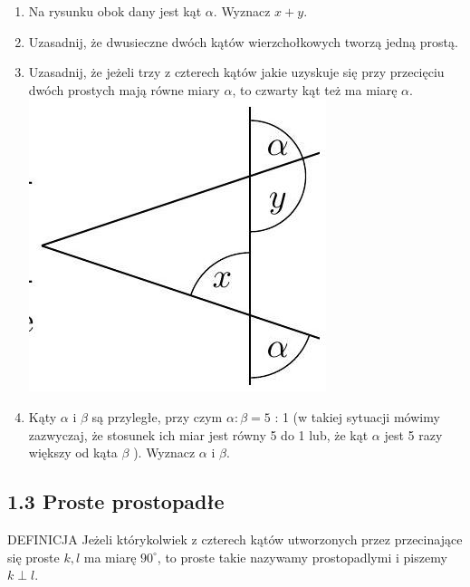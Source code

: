 \documentclass[10pt]{article}
\begin{document}
\begin{enumerate}
  \item Na rysunku obok dany jest kąt \(\alpha\). Wyznacz \(x+y\).
  \item Uzasadnij, że dwusieczne dwóch kątów wierzchołkowych tworzą jedną prostą.
  \item Uzasadnij, że jeżeli trzy z czterech kątów jakie uzyskuje się przy przecięciu dwóch prostych mają równe miary \(\alpha\), to czwarty kąt też ma miarę \(\alpha\).\\
\includegraphics[max width=\textwidth, center]{2024_11_21_71f62bd117d375398909g-009(1)}
  \item Kąty \(\alpha\) i \(\beta\) są przyległe, przy czym \(\alpha: \beta=5\) : 1 (w takiej sytuacji mówimy zazwyczaj, że stosunek ich miar jest równy 5 do 1 lub, że kąt \(\alpha\) jest 5 razy większy od kąta \(\beta\) ). Wyznacz \(\alpha\) i \(\beta\).
\end{enumerate}

\subsection*{1.3 Proste prostopadłe}
DEFINICJA Jeżeli którykolwiek z czterech kątów utworzonych przez przecinające się proste \(k, l\) ma miarę \(90^{\circ}\), to proste takie nazywamy prostopadlymi i piszemy \(k \perp l\).
\end{document}
